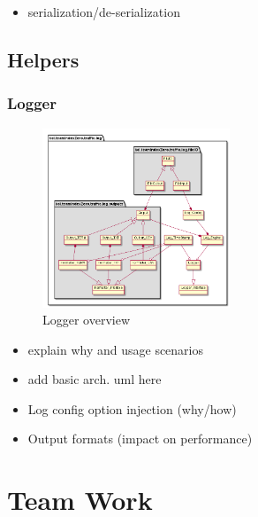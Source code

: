 \begin{itemize}
	\item serialization/de-serialization
\end{itemize}

\subsection{Helpers}

\subsubsection{Logger}
\begin{figure}[h!]
	\vspace{1.5em}
  	\caption{Logger overview}
  	\label{fig:logger_overview}
  	\centering
	\includegraphics[width=0.5\textwidth]{figs/logModuleObjectDiagram.png}
  	\vspace{1.5em}
\end{figure}

    \begin{itemize}
        \item explain why and usage scenarios
        \item add basic arch. uml here
        \item Log config option injection (why/how)
        \item Output formats (impact on performance)
    \end{itemize}
    

\section{Team Work}

